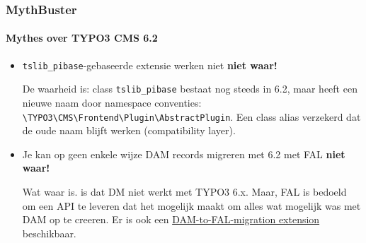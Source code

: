 \begin{frame}[fragile]
	\frametitle{MythBuster}
	\framesubtitle{Mythes over TYPO3 CMS 6.2}

	\begin{itemize}
		\item \texttt{tslib\_pibase}-gebaseerde extensie werken niet\newline
			\tabto{8.4cm}\color{red}\textbf{\textrightarrow niet waar!}\color{black}

			\smaller
				De waarheid is: class \texttt{tslib\_pibase} bestaat nog steeds in 6.2, maar heeft een nieuwe naam door namespace conventies: \texttt{\textbackslash TYPO3\textbackslash CMS\textbackslash Frontend\textbackslash Plugin\textbackslash AbstractPlugin}.\newline
				Een class alias verzekerd dat de oude naam blijft werken (compatibility layer).
			\normalsize

		\item Je kan op geen enkele wijze DAM records migreren met 6.2 met FAL\newline
			\tabto{8.4cm}\color{red}\textbf{\textrightarrow niet waar!}\color{black}

			\smaller
				Wat waar is. is dat DM niet werkt met TYPO3 6.x. Maar, FAL is bedoeld om een API te leveren dat het mogelijk maakt om alles wat mogelijk was met DAM op te creeren. Er is ook een \href{https://github.com/fnagel/t3ext-dam_falmigration}{DAM-to-FAL-migration extension} beschikbaar.
			\normalsize

	\end{itemize}

\end{frame}


